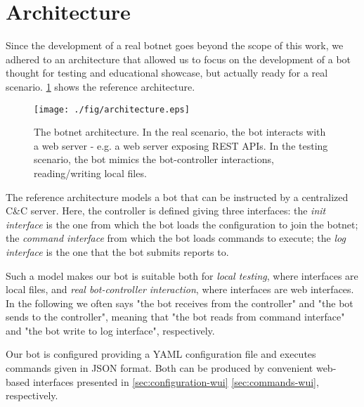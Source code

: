 \section{Architecture}
\label{sec:architecture}

Since the development of a real botnet goes beyond the scope of this work, we adhered to an architecture that allowed us to focus on the development of a bot thought for testing and educational showcase, but actually ready for a real scenario. \ref{fig:botnet-architecture} shows the reference architecture.

\begin{figure}[tp]
  \centering
  \texttt{[image: ./fig/architecture.eps]}
  \caption{The botnet architecture. In the real scenario, the bot interacts with a web server - e.g. a web server exposing REST APIs. In the testing scenario, the bot mimics the bot-controller interactions, reading/writing local files.}
    \label{fig:botnet-architecture}
\end{figure}

The reference architecture models a bot that can be instructed by a centralized C\&C server.
Here, the controller is defined giving three interfaces: the \textit{init interface} is the one from which the bot loads the configuration to join the botnet; the \textit{command interface} from which the bot loads commands to execute; the \textit{log interface} is the one that the bot submits reports to.

Such a model makes our bot is suitable both for \textit{local testing}, where interfaces are local files, and \textit{real bot-controller interaction}, where interfaces are web interfaces. In the following we often says "the bot receives from the controller" and "the bot sends to the controller", meaning that "the bot reads from command interface" and "the bot write to log interface", respectively.

Our bot is configured providing a YAML configuration file and executes commands given in JSON format. Both can be produced by convenient web-based interfaces presented in \ref{sec:configuration-wui} \ref{sec:commands-wui}, respectively.

